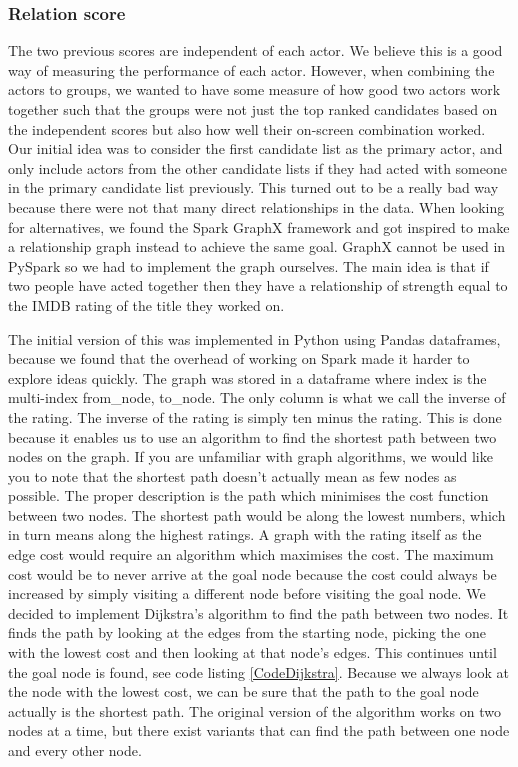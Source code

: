 \subsubsection{Relation score}

The two previous scores are independent of each actor. We believe this is a good way of measuring the performance of each actor. However, when combining the actors to groups, we wanted to have some measure of how good two actors work together such that the groups were not just the top ranked candidates based on the independent scores but also how well their on-screen combination worked. Our initial idea was to consider the first candidate list as the primary actor, and only include actors from the other candidate lists if they had acted with someone in the primary candidate list previously. This turned out to be a really bad way because there were not that many direct relationships in the data. When looking for alternatives, we found the Spark GraphX framework and got inspired to make a relationship graph instead to achieve the same goal. GraphX cannot be used in PySpark so we had to implement the graph ourselves. The main idea is that if two people have acted together then they have a relationship of strength equal to the IMDB rating of the title they worked on.

The initial version of this was implemented in Python using Pandas dataframes, because we found that the overhead of working on Spark made it harder to explore ideas quickly. The graph was stored in a dataframe where index is the multi-index from\_node, to\_node. The only column is what we call the inverse of the rating. The inverse of the rating is simply ten minus the rating. This is done because it enables us to use an algorithm to find the shortest path between two nodes on the graph. If you are unfamiliar with graph algorithms, we would like you to note that the shortest path doesn’t actually mean as few nodes as possible. The proper description is the path which minimises the cost function between two nodes. The shortest path would be along the lowest numbers, which in turn means along the highest ratings. A graph with the rating itself as the edge cost would require an algorithm which maximises the cost. The maximum cost would be to never arrive at the goal node because the cost could always be increased by simply visiting a different node before visiting the goal node. We decided to implement Dijkstra’s algorithm to find the path between two nodes. It finds the path by looking at the edges from the starting node, picking the one with the lowest cost and then looking at that node’s edges. This continues until the goal node is found, see code listing \ref{CodeDijkstra}. Because we always look at the node with the lowest cost, we can be sure that the path to the goal node actually is the shortest path. The original version of the algorithm works on two nodes at a time, but there exist variants that can find the path between one node and every other node.

